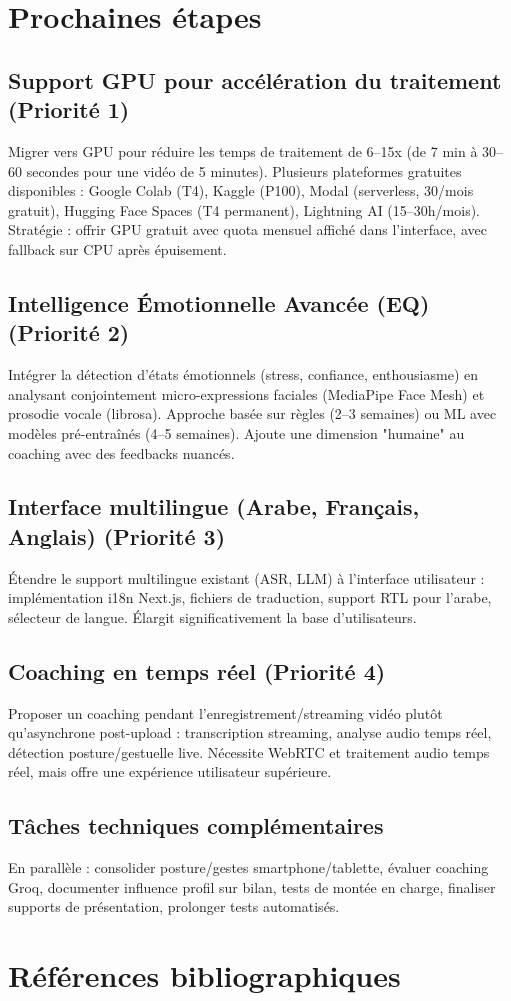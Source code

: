 ﻿\documentclass[12pt,a4paper]{article}
\begin{document}
\section{Prochaines étapes}

\subsection{Support GPU pour accélération du traitement (Priorité 1)}
Migrer vers GPU pour réduire les temps de traitement de 6--15x (de 7 min à 30--60 secondes pour une vidéo de 5 minutes). Plusieurs plateformes gratuites disponibles : Google Colab (T4), Kaggle (P100), Modal (serverless, 30\texteuro/mois gratuit), Hugging Face Spaces (T4 permanent), Lightning AI (15--30h/mois). Stratégie : offrir GPU gratuit avec quota mensuel affiché dans l'interface, avec fallback sur CPU après épuisement.

\subsection{Intelligence Émotionnelle Avancée (EQ) (Priorité 2)}
Intégrer la détection d'états émotionnels (stress, confiance, enthousiasme) en analysant conjointement micro-expressions faciales (MediaPipe Face Mesh) et prosodie vocale (librosa). Approche basée sur règles (2--3 semaines) ou ML avec modèles pré-entraînés (4--5 semaines). Ajoute une dimension "humaine" au coaching avec des feedbacks nuancés.

\subsection{Interface multilingue (Arabe, Français, Anglais) (Priorité 3)}
Étendre le support multilingue existant (ASR, LLM) à l'interface utilisateur : implémentation i18n Next.js, fichiers de traduction, support RTL pour l'arabe, sélecteur de langue. Élargit significativement la base d'utilisateurs.

\subsection{Coaching en temps réel (Priorité 4)}
Proposer un coaching pendant l'enregistrement/streaming vidéo plutôt qu'asynchrone post-upload : transcription streaming, analyse audio temps réel, détection posture/gestuelle live. Nécessite WebRTC et traitement audio temps réel, mais offre une expérience utilisateur supérieure.

\subsection{Tâches techniques complémentaires}
En parallèle : consolider posture/gestes smartphone/tablette, évaluer coaching Groq, documenter influence profil sur bilan, tests de montée en charge, finaliser supports de présentation, prolonger tests automatisés.
\newpage
\section{Références bibliographiques}


\end{document}
